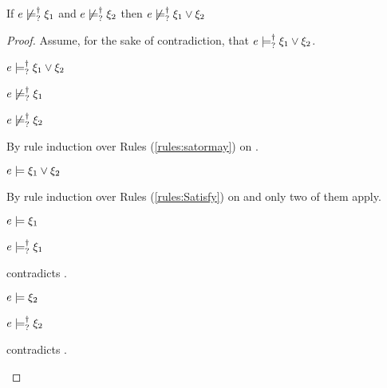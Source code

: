 \begin{lemma}
  \label{lem:or-nn-satisfy}
  If $e \not\models_{?}^{\dag} \xi_1$ and $e \not\models_{?}^{\dag} \xi_2$ then $e \not\models_{?}^{\dag} \xi_1 \vee \xi_2$
\end{lemma}
\begin{proof}
  Assume, for the sake of contradiction, that $e \models_{?}^{\dag} \xi_1 \vee \xi_2$.
\begin{pfsteps*}
\item $e \models_{?}^{\dag} \xi_1 \vee \xi_2$  
\item $e \not\models_{?}^{\dag} \xi_1$  
\item $e \not\models_{?}^{\dag} \xi_2$  
\end{pfsteps*}
By rule induction over Rules (\ref{rules:satormay}) on .
\begin{byCases}

\item[\text{(\ref{rule:CSMSSat})}]
  \begin{pfsteps*}
  \item $e \models \xi_1 \vee \xi_2$  
  \end{pfsteps*}
  By rule induction over Rules (\ref{rules:Satisfy}) on  and only two of them apply.
  \begin{byCases}

  \item[\text{(\ref{rule:CSOr1})}]
    \begin{pfsteps*}
    \item $e \models \xi_1$  
    \item $e \models_{?}^{\dag} \xi_1$  
    \end{pfsteps*}
     contradicts .

  \item[\text{(\ref{rule:CSOr2})}]
    \begin{pfsteps*}
    \item $e \models \xi_2$  
    \item $e \models_{?}^{\dag} \xi_2$  
    \end{pfsteps*}
     contradicts .


\end{byCases}
\end{byCases}
\end{proof}
